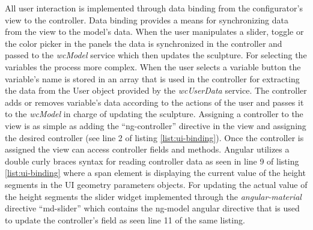 \documentclass[../medieninformatik-arbeit.tex]{subfiles}
\begin{document}
All user interaction is implemented through data binding from the configurator's view to the controller. Data binding provides a means for synchronizing data from the view to the model's data. When the user manipulates a slider, toggle or the color picker in the panels the data is synchronized in the controller and passed to the \textit{wcModel} service which then updates the sculpture. For selecting the variables the process more complex. When the user selects a variable button the variable's name is stored in an array that is used in the controller for extracting the data from the User object provided by the \textit{wcUserData} service. The controller adds or removes variable's data according to the actions of the user and passes it to the \textit{wcModel} in charge of updating the sculpture. Assigning a controller to the view is as simple as adding the ``ng-controller'' directive in the view and assigning the desired controller (see line 2 of listing \ref{list:ui-binding}). Once the controller is assigned the view can access controller fields and methods. Angular utilizes a double curly braces syntax for reading controller data as seen in line 9 of listing \ref{list:ui-binding} where a span element is displaying the current value of the height segments in the UI geometry parameters objects. For updating the actual value of the height segments the slider widget implemented through the \textit{angular-material} directive ``md-slider'' which contains the ng-model angular directive that is used to update the controller's field as seen line 11 of the same listing. 
\end{document}
